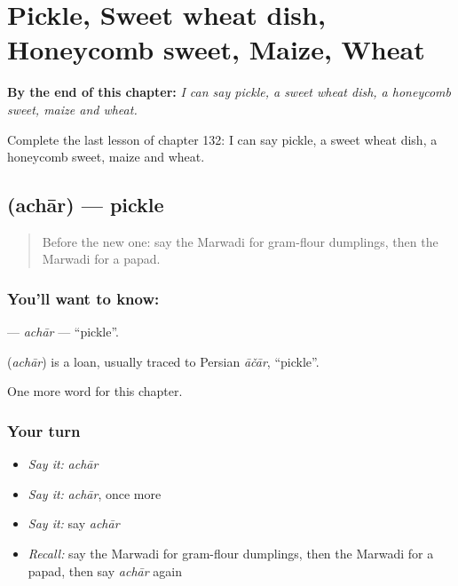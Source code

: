 
\chapter{Pickle, Sweet wheat dish, Honeycomb sweet, Maize, Wheat}
\label{ch:mw-pickle-sweet-wheat-dish-honeycomb-sweet-maize-wheat}

\begin{chapteropening}
\textbf{By the end of this chapter:} \emph{I can say pickle, a sweet wheat dish, a honeycomb sweet, maize and wheat.}

Complete the last lesson of chapter 132: I can say pickle, a sweet wheat dish, a honeycomb sweet, maize and wheat.
\end{chapteropening}

\section[\texorpdfstring{\mw{अचार} (achār)}{अचार (achār)}]{ (achār) — pickle}

\label{lesson:MW-C132-achar}



\begin{quote}
Before the new one: say the Marwadi for gram-flour dumplings, then the Marwadi for a papad.
\end{quote}

\subsection*{You'll want to know: }
\textbf{} — \emph{achār} — \textquotedblleft{}pickle\textquotedblright{}.

\begin{cousinweb}
\textbf{} (\emph{achār}) is a loan, usually traced to Persian \emph{āčār}, \textquotedblleft{}pickle\textquotedblright{}.
\end{cousinweb}

\begin{grammarlens}[title={What you've built}]
One more word for this chapter.
\end{grammarlens}

\subsection*{Your turn}
\begin{itemize}
\raggedright
  \item \emph{Say it:} \emph{achār}
  \item \emph{Say it:} \emph{achār}, once more
  \item \emph{Say it:} say \emph{achār}
  \item \emph{Recall:} say the Marwadi for gram-flour dumplings, then the Marwadi for a papad, then say \emph{achār} again
\end{itemize}

